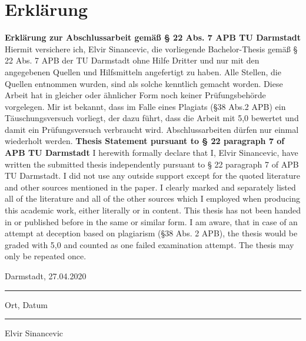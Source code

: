 \chapter*{Erklärung}\label{cha:Erklärung}
\textbf{Erklärung zur Abschlussarbeit gemäß § 22 Abs. 7 APB TU Darmstadt}
\newline\newline
Hiermit versichere ich, Elvir Sinancevic, die vorliegende Bachelor-Thesis gemäß § 22 Abs. 7 APB der TU Darmstadt ohne Hilfe Dritter und nur mit den angegebenen Quellen und Hilfsmitteln angefertigt zu haben. Alle Stellen, die Quellen entnommen wurden, sind als solche kenntlich gemacht worden. Diese Arbeit hat in gleicher oder ähnlicher Form noch keiner Prüfungsbehörde vorgelegen. 
\newline\newline
Mir ist bekannt, dass im Falle eines Plagiats (§38 Abs.2 APB) ein Täuschungsversuch vorliegt, der dazu führt, dass die Arbeit mit 5,0 bewertet und damit ein Prüfungsversuch verbraucht wird. Abschlussarbeiten dürfen nur einmal wiederholt werden.
\newline\newline
\newline\newline
\textbf{Thesis Statement pursuant to § 22 paragraph 7 of APB TU Darmstadt}
\newline\newline
I herewith formally declare that I, Elvir Sinancevic, have written the submitted thesis independently pursuant to § 22 paragraph 7 of APB TU Darmstadt. I did not use any outside support except for the quoted literature and other sources mentioned in the paper. I clearly marked and separately listed all of the literature and all of the other sources which I employed when producing this academic work, either literally or in content. This thesis has not been handed in or published before in the same or similar form.
\newline\newline
I am aware, that in case of an attempt at deception based on plagiarism (§38 Abs. 2 APB), the thesis would be graded with 5,0 and counted as one failed examination attempt. The thesis may only be repeated once.
\newline\newline
\newline\newline
\parbox{5cm}{\centering Darmstadt, 27.04.2020\hrule
	\strut \centering\footnotesize Ort, Datum} \hfill\parbox{5cm}{\hrule
	\strut \centering\footnotesize Elvir Sinancevic}